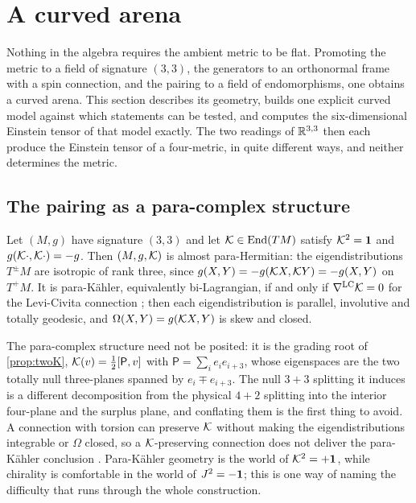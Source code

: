 \section{A curved arena}
\label{sec:curved}

Nothing in the algebra requires the ambient metric to be flat. Promoting the metric to a field of signature $(3,3)$, the generators to an
orthonormal frame with a spin connection, and the pairing to a field of endomorphisms, one obtains a curved arena. This section describes its
geometry, builds one explicit curved model against which statements can be tested, and computes the six-dimensional Einstein tensor of that
model exactly. The two readings of $\mathbb{R}^{3,3}$ then each produce the Einstein tensor of a four-metric, in quite different ways, and neither
determines the metric.

\subsection{The pairing as a para-complex structure}

\begin{proposition}
\label{prop:parahermitian}
Let $(M,g)$ have signature $(3,3)$ and let $\mathcal K\in\operatorname{End}(TM)$ satisfy $\mathcal K^2=\mathbf 1$ and $g(\mathcal K\cdot,\mathcal K\cdot)=-g$. Then $(M,g,\mathcal K)$ is almost
para-Hermitian: the eigendistributions $T^\pm M$ are isotropic of rank three, since $g(X,Y)=-g(\mathcal K X,\mathcal K Y)=-g(X,Y)$ on $T^+M$. It is
para-K\"ahler, equivalently bi-Lagrangian, if and only if $\nabla^{\rm LC}\mathcal K=0$ for the Levi-Civita connection \cite{CruceanuFortunyGadea96,EtayoSantamaria06};
then each eigendistribution is parallel, involutive and totally geodesic, and $\Omega(X,Y)=g(\mathcal K X,Y)$ is skew and closed.
\end{proposition}

The para-complex structure need not be posited: it is the grading root of \cref{prop:twoK}, $\mathcal K(v)=\tfrac12[\mathsf P,v]$ with $\mathsf P=\sum_ie_ie_{i+3}$,
whose eigenspaces are the two totally null three-planes spanned by $e_i\mp e_{i+3}$. The null $3{+}3$ splitting it induces is a different
decomposition from the physical $4{+}2$ splitting into the interior four-plane and the surplus plane, and conflating them is the first thing to avoid. A
connection with torsion can preserve $\mathcal K$ without making the eigendistributions integrable or $\Omega$ closed, so a $\mathcal K$-preserving connection does not
deliver the para-K\"ahler conclusion \cite{MarottaSzabo21,LoustauSanders22}. Para-K\"ahler geometry is the world of $\mathcal K^2=+\mathbf 1$, while chirality is
comfortable in the world of $J^2=-\mathbf 1$; this is one way of naming the difficulty that runs through the whole construction.

